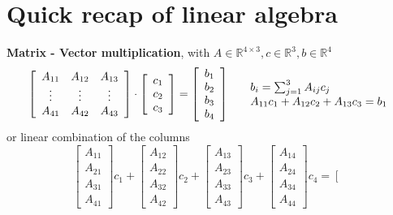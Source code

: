 \documentclass[10pt]{report}
\begin{document}
\section{Quick recap of linear algebra}
\begin{list}{}{}
	\item \textbf{Matrix - Vector multiplication}, with $A\in \mathbb{R}^{4\times 3}, c\in \mathbb{R}^3, b\in \mathbb{R}^4$
	$$\left[\begin{array}{c c c}
		A_{11} & A_{12} & A_{13}\\
		\vdots & \vdots & \vdots\\
		A_{41} & A_{42} & A_{43}
	\end{array}\right]\cdot \left[\begin{array}{c}
		c_1\\c_2\\c_3
	\end{array}\right] = \left[\begin{array}{c}
		b_1\\b_2\\b_3\\b_4
	\end{array}\right]\:\:\:\:\:\:\begin{array}{l}
		b_i = \sum_{j=1}^3 A_{ij}c_j\\
		A_{11}c_1 + A_{12}c_2 + A_{13}c_3 = b_1
	\end{array}$$
	or linear combination of the columns
	$$\left[\begin{array}{c}
	A_{11}\\A_{21}\\A_{31}\\A_{41}
	\end{array}\right]c_1 + \left[\begin{array}{c}
	A_{12}\\A_{22}\\A_{32}\\A_{42}
	\end{array}\right]c_2 + \left[\begin{array}{c}
	A_{13}\\A_{23}\\A_{33}\\A_{43}
	\end{array}\right]c_3 + \left[\begin{array}{c}
	A_{14}\\A_{24}\\A_{34}\\A_{44}
	\end{array}\right]c_4 = \left[\begin{array}{c}

\end{array}$$
\end{list}
\end{document}
